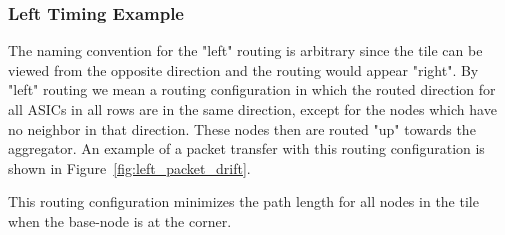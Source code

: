 \subsubsection{Left Timing Example}

The naming convention for the "left" routing is arbitrary since the tile can be viewed from the opposite direction and the routing would appear "right".
By "left" routing we mean a routing configuration in which the routed direction for all ASICs in all rows are in the same direction, except for the nodes which have no neighbor in that direction.
These nodes then are routed "up" towards the aggregator.
An example of a packet transfer with this routing configuration is shown in Figure~\ref{fig:left_packet_drift}.

This routing configuration minimizes the path length for all nodes in the tile when the base-node is at the corner.

